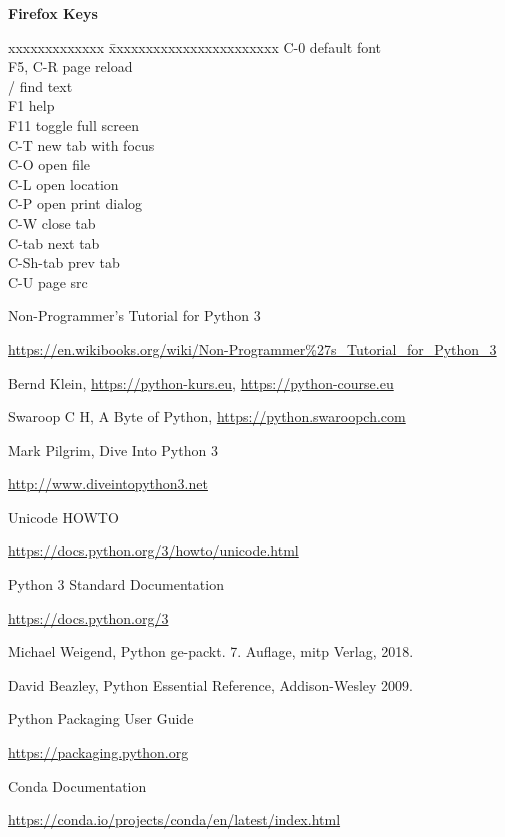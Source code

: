 \documentclass[9pt,a4wide]{extarticle}
\begin{document}
{\bf Firefox Keys}
{}

\begin{tabbing}
    xxxxxxxxxxxxx \= xxxxxxxxxxxxxxxxxxxxxxx \kill
    C-0           \> default font   \\
    F5, C-R       \> page reload  \\
    /             \> find text  \\
    F1            \> help   \\
    F11           \> toggle full screen  \\
    C-T           \> new tab with focus  \\
    C-O           \> open file  \\
    C-L           \> open location  \\
    C-P           \> open print dialog   \\
    C-W           \> close tab  \\
    C-tab         \> next tab  \\
    C-Sh-tab      \> prev tab  \\
    C-U           \> page src  \\
\end{tabbing}
    




\begin{thebibliography}{zzzz}

 Non-Programmer's Tutorial for Python 3

   \url{https://en.wikibooks.org/wiki/Non-Programmer%27s_Tutorial_for_Python_3}

 Bernd Klein, \url{https://python-kurs.eu},
    \url{https://python-course.eu}

 Swaroop C H, A Byte of Python, \url{https://python.swaroopch.com}

 Mark Pilgrim, Dive Into Python 3

    \url{http://www.diveintopython3.net}

 Unicode HOWTO

    \url{https://docs.python.org/3/howto/unicode.html}

 Python 3 Standard Documentation

    \url{https://docs.python.org/3}

 Michael Weigend, Python ge-packt. 7. Auflage, mitp Verlag, 2018.

 David Beazley, Python Essential Reference, Addison-Wesley 2009.

 Python Packaging User Guide

    \url{https://packaging.python.org}

 Conda Documentation

    \url{https://conda.io/projects/conda/en/latest/index.html}

\end{thebibliography}
\end{document}
